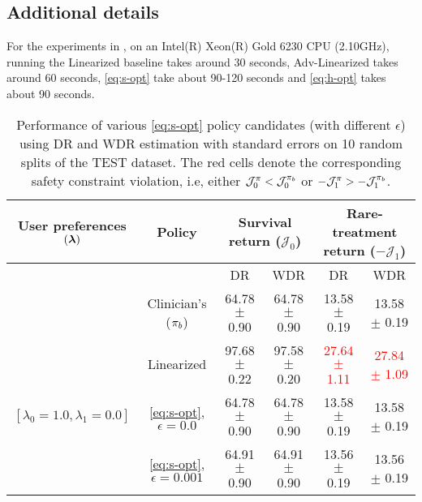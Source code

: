 \subsection{Additional details}

For the experiments in , on an Intel(R) Xeon(R) Gold 6230 CPU (2.10GHz), running the Linearized baseline takes around 30 seconds, Adv-Linearized takes around 60 seconds, \ref{eq:s-opt} take about 90-120 seconds and \ref{eq:h-opt} takes about 90 seconds.



\begin{table}[h]
    \centering
    \caption{
    Performance of various \ref{eq:s-opt} policy candidates (with different $\epsilon$) using DR and WDR estimation with standard errors on 10 random splits of the TEST dataset. 
    The red cells denote the corresponding safety constraint violation, i.e, either $\mathcal{J}_{0}^{\pi} < \mathcal{J}_{0}^{\pi_{b}}$ or $-\mathcal{J}_{1}^{\pi} > -\mathcal{J}_{1}^{\pi_{b}}$.}
    \label{table:app-s-opt-test}
    \vskip 0.1in
    \begin{adjustbox}{max width=1\textwidth,center}
    \begin{tabular}{cccccc}
    \toprule
    \multicolumn{1}{c}{User preferences $(\bm{\lambda})$} & \multicolumn{1}{c}{Policy} & \multicolumn{2}{c}{Survival return ($\mathcal{J}_0$)} & \multicolumn{2}{c}{Rare-treatment return ($- \mathcal{J}_1$)} \\
    \hline
    & & DR & WDR & DR & WDR  \\  \cline{3-6}
    & Clinician's ($\pi_{b}$) & 64.78 $\pm$ 0.90 & 64.78 $\pm$ 0.90          & 13.58 $\pm$ 0.19 & 13.58 $\pm$ 0.19  \\
    \midrule
    \multirow{4}{*}{$[\lambda_0=1.0, \lambda_1 = 0.0]$} 
& Linearized & 97.68 $\pm$ 0.22 & 97.58 $\pm$ 0.20   & \textcolor{red}{27.64 $\pm$ 1.11 }& \textcolor{red}{27.84 $\pm$ 1.09 } \\ 
& \ref{eq:s-opt}, $\epsilon=0.0$  & 64.78 $\pm$ 0.90 & 64.78 $\pm$ 0.90   & 13.58 $\pm$ 0.19 & 13.58 $\pm$ 0.19  \\
& \ref{eq:s-opt}, $\epsilon=0.001$  & 64.91 $\pm$ 0.90 & 64.91 $\pm$ 0.90   & 13.56 $\pm$ 0.19 & 13.56 $\pm$ 0.19  \\

\end{tabular}
\end{adjustbox}
\end{table}
